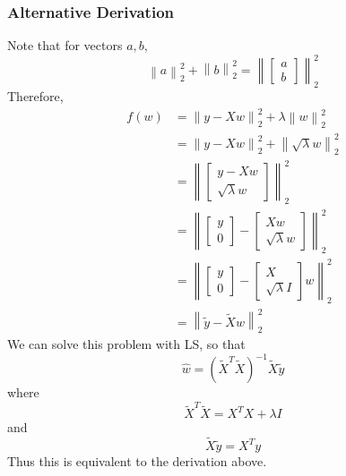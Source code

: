 \documentclass[12pt]{article}
\theoremstyle{definition}
\newcommand{\norm}[1]{\left\lVert#1\right\rVert}
\begin{document}
\subsubsection{Alternative Derivation}
Note that for vectors $a, b$, 
\begin{equation}
	\norm{a}^2_2 + \norm{b}^2_2 = \norm{\begin{bmatrix} a \\ b \end{bmatrix}}^2_2
\end{equation}
Therefore, 
\begin{align*}
	f(w) &= \norm{y - Xw}^2_2 + \lambda \norm{w}^2_2 \\
	&= \norm{y - Xw}^2_2 + \norm{\sqrt{\lambda} w}^2_2 \\
	&= \norm{\begin{bmatrix} y - Xw \\ \sqrt{\lambda}w \end{bmatrix}}^2_2 \\
	&= \norm{\begin{bmatrix} y \\ 0 \end{bmatrix} - \begin{bmatrix} Xw \\ \sqrt{\lambda}w \end{bmatrix}}^2_2 \\
	&= \norm{\begin{bmatrix} y \\ 0 \end{bmatrix} - \begin{bmatrix} X \\ \sqrt{\lambda}I \end{bmatrix} w}^2_2 \\
	&= \norm{\tilde{y} - \tilde{X}w}^2_2
\end{align*}
We can solve this problem with LS, so that
\begin{equation}
	\hat w = (\tilde{X}^T \tilde{X})^{-1} \tilde{X} \tilde{y}
\end{equation}
where
\begin{equation}
	\tilde{X}^T \tilde{X} = X^TX + \lambda I
\end{equation}
and
\begin{equation}
	\tilde{X} \tilde{y} = X^Ty
\end{equation}
Thus this is equivalent to the derivation above. 
\end{document}
